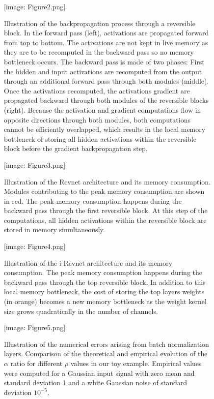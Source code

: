 \documentclass[twocolumn]{bmcart}
\def\texttt{[image: ]}
\begin{document}
\begin{backmatter}
\begin{figure}[t]
\texttt{[image: Figure2.png]}
\caption{
Illustration of the backpropagation process through a reversible block.
In the forward pass (left), activations are propagated forward from top to bottom.
The activations are not kept in live memory as they are to be recomputed in the backward pass so no memory bottleneck occurs.
The backward pass is made of two phases: 
First the hidden and input activations are recomputed from the output through an additional forward pass through both modules (middle).
Once the activations recomputed, the activations gradient are propagated backward through both modules of the reversible blocks (right).
Because the activation and gradient computations flow in opposite directions through both modules,
both computations cannot be efficiently overlapped, which results in the local memory bottleneck of 
storing all hidden activations within the reversible block before the gradient backpropagation step.
}
\end{figure}

\begin{figure}[t]
\texttt{[image: Figure3.png]}
\caption{
Illustration of the Revnet architecture and its memory consumption.
Modules contributing to the peak memory consumption are shown in red.
The peak memory consumption happens during the backward pass through the first reversible block.
At this step of the computations, all hidden activations within the reversible block are stored in memory simultaneously.
}
\end{figure}

\begin{figure}[t]
\texttt{[image: Figure4.png]}
\caption{
Illustration of the i-Revnet architecture and its memory consumption.
The peak memory consumption happens during the backward pass through the top reversible block.
In addition to this local memory bottleneck, the cost of storing the top layers weights 
(in orange) becomes a new memory bottleneck as the 
weight kernel size grows quadratically in the number of channels.
}
\end{figure}


\begin{figure}[t]
\texttt{[image: Figure5.png]}
\caption{
Illustration of the numerical errors arising from batch normalization layers.
Comparison of the theoretical and empirical evolution of the $\alpha$ ratio for different $\rho$ values in our toy example.
Empirical values were computed for a Gaussian input signal with zero mean and standard deviation 1 and a white Gaussian noise of standard deviation $10^{-5}$.
}
\end{figure}


\end{backmatter}
\end{document}

